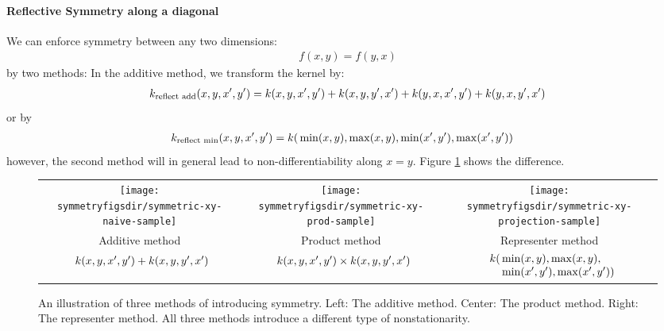 \paragraph{Reflective Symmetry along a diagonal}
We can enforce symmetry between any two dimensions:
%
\begin{align}
f(x, y) = f( y, x)
\end{align}
%
by two methods:  In the additive method, we transform the kernel by:
%
\begin{align}
k_{\textnormal{reflect add}}(x, y, x', y') 
 = k(x, y, x', y') + k(x, y, y', x')
 + k(y, x, x', y') + k(y, x, y', x')
\end{align}
%
or by
%
\begin{align}
k_{\textnormal{reflect min}}(x, y, x', y') = k( & \min(x, y), \max(x,y), %
\min(x', y'), \max(x',y') )
\end{align}
however, the second method will in general lead to non-differentiability along $x = y$.  Figure \ref{fig:add_vs_min} shows the difference.

\begin{figure}
\begin{tabular}{ccc}
\texttt{[image: \\symmetryfigsdir/symmetric-xy-naive-sample]} &
\texttt{[image: \\symmetryfigsdir/symmetric-xy-prod-sample]} &
\texttt{[image: \\symmetryfigsdir/symmetric-xy-projection-sample]} \\
Additive method & Product method & Representer method \\[0.5ex]
$\begin{array}{r@{}l@{}}
k(x, y, x', y') & {}+ k(x, y, y', x') 
\end{array}$
&
$\begin{array}{r@{}l@{}}
k(x, y, x', y') & {}\times k(x, y, y', x') \\
\end{array}$
&
$\begin{array}{r@{}l@{}}
k( &{}\min(x, y), \max(x,y), \\
&{}\min(x', y'), \max(x',y') )
\end{array}$
\end{tabular}
\caption[Three ways to introduce symmetry]{An illustration of three methods of introducing symmetry.
Left:  The additive method.
Center: The product method.
Right: The representer method.
All three methods introduce a different type of nonstationarity.
}
\label{fig:add_vs_min}
\end{figure}



